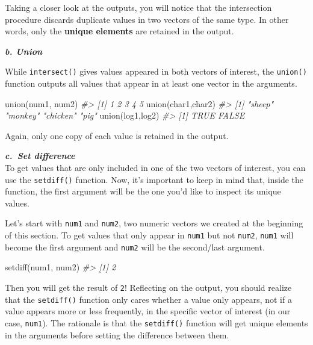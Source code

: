 \documentclass[
]{book}
\newenvironment{Shaded}{\begin{snugshade}}{\end{snugshade}}
\newcommand{\CommentTok}[1]{\textcolor[rgb]{0.56,0.35,0.01}{\textit{#1}}}
\newcommand{\FunctionTok}[1]{\textcolor[rgb]{0.00,0.00,0.00}{#1}}
\newcommand{\NormalTok}[1]{#1}
\begin{document}
Taking a closer look at the outputs, you will notice that the intersection procedure discards duplicate values in two vectors of the same type. In other words, only the \textbf{unique elements} are retained in the output.

\textbf{\emph{b. Union}}

While \texttt{intersect()} gives values appeared in both vectors of interest, the \texttt{union()} function outputs all values that appear in at least one vector in the arguments.

\begin{Shaded}
\begin{Highlighting}[]
\FunctionTok{union}\NormalTok{(num1, num2)}
\CommentTok{\#\textgreater{} [1] 1 2 3 4 5}
\FunctionTok{union}\NormalTok{(char1,char2)}
\CommentTok{\#\textgreater{} [1] "sheep"   "monkey"  "chicken" "pig"}
\FunctionTok{union}\NormalTok{(log1,log2)}
\CommentTok{\#\textgreater{} [1]  TRUE FALSE}
\end{Highlighting}
\end{Shaded}

Again, only one copy of each value is retained in the output.

\textbf{\emph{c.~Set difference}}\\
To get values that are only included in one of the two vectors of interest, you can use the \texttt{setdiff()} function. Now, it's important to keep in mind that, inside the function, the first argument will be the one you'd like to inspect its unique values.

Let's start with \texttt{num1} and \texttt{num2}, two numeric vectors we created at the beginning of this section. To get values that only appear in \texttt{num1} but not \texttt{num2}, \texttt{num1} will become the first argument and \texttt{num2} will be the second/last argument.

\begin{Shaded}
\begin{Highlighting}[]
\FunctionTok{setdiff}\NormalTok{(num1, num2)}
\CommentTok{\#\textgreater{} [1] 2}
\end{Highlighting}
\end{Shaded}

Then you will get the result of \texttt{2}! Reflecting on the output, you should realize that the \texttt{setdiff()} function only cares whether a value only appears, not if a value appears more or less frequently, in the specific vector of interest (in our case, \texttt{num1}). The rationale is that the \texttt{setdiff()} function will get unique elements in the arguments before setting the difference between them.
\end{document}
